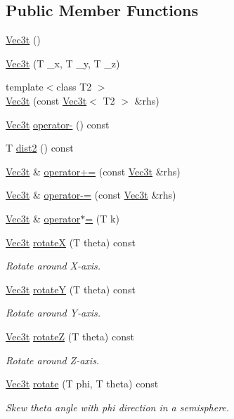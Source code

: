 \subsection*{Public Member Functions}
\begin{DoxyCompactItemize}
\item 
\hyperlink{structVec3t_a7b34fabf25ecd175b48676c94e1d30e2}{Vec3t} ()
\item 
\hyperlink{structVec3t_a875345565deb7041f491007694069643}{Vec3t} (T \+\_\+x, T \+\_\+y, T \+\_\+z)
\item 
{\footnotesize template$<$class T2 $>$ }\\\hyperlink{structVec3t_aa0dc41bfc5a79373fbbd097d04424cb3}{Vec3t} (const \hyperlink{structVec3t}{Vec3t}$<$ T2 $>$ \&rhs)
\item 
\hyperlink{structVec3t}{Vec3t} \hyperlink{structVec3t_a038cd4e9b899cf7a49bea445981d2f25}{operator-\/} () const 
\item 
T \hyperlink{structVec3t_adc5afa9029b489909309fb6fa9f753f0}{dist2} () const 
\item 
\hyperlink{structVec3t}{Vec3t} \& \hyperlink{structVec3t_a4be2b3ccfcb0c7193141ad00877bb270}{operator+=} (const \hyperlink{structVec3t}{Vec3t} \&rhs)
\item 
\hyperlink{structVec3t}{Vec3t} \& \hyperlink{structVec3t_affe2466fb808a27bc15b507de3defcd0}{operator-\/=} (const \hyperlink{structVec3t}{Vec3t} \&rhs)
\item 
\hyperlink{structVec3t}{Vec3t} \& \hyperlink{structVec3t_a52a2a99aeaa3fba66c8d8efd566f1927}{operator$\ast$=} (T k)
\item 
\hyperlink{structVec3t}{Vec3t} \hyperlink{structVec3t_a95866fa2e01251b7a5920ce9d432341a}{rotateX} (T theta) const 
\begin{DoxyCompactList}\small\item\em Rotate around X-\/axis. \end{DoxyCompactList}\item 
\hyperlink{structVec3t}{Vec3t} \hyperlink{structVec3t_a66847d9c91164216e253359d7e12d6fe}{rotateY} (T theta) const 
\begin{DoxyCompactList}\small\item\em Rotate around Y-\/axis. \end{DoxyCompactList}\item 
\hyperlink{structVec3t}{Vec3t} \hyperlink{structVec3t_ac781f5660c197927efea3ade0b940dd3}{rotateZ} (T theta) const 
\begin{DoxyCompactList}\small\item\em Rotate around Z-\/axis. \end{DoxyCompactList}\item 
\hyperlink{structVec3t}{Vec3t} \hyperlink{structVec3t_a4dd2b7633407d6eec22ad24a222f9341}{rotate} (T phi, T theta) const 
\begin{DoxyCompactList}\small\item\em Skew theta angle with phi direction in a semisphere. \end{DoxyCompactList}\end{DoxyCompactItemize}
